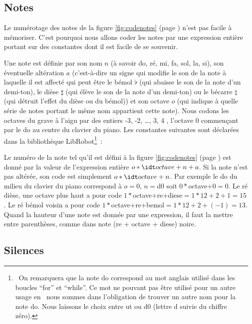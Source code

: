 

\subsection{Notes}

\noindent Le numérotage des notes de la figure \ref{fig:codenotes} (page \pageref{fig:codenotes}) n'est
pas facile à mé\-mo\-ri\-ser. C'est pourquoi nous allons coder les notes par
une expression entière portant sur des constantes dont il est facile de se souvenir.

Une note est définie par son nom $n$ (à savoir do, ré, mi, fa, sol, la, si), son éventuelle
altération $a$ (c'est-à-dire un signe qui modifie le son de la note à laquelle il est affecté
qui peut être le bémol $\flat$ (qui abaisse le son de la note d'un demi-ton),
le dièse $\sharp$ (qui élève le son de la note d'un demi-ton) ou
le bécarre $\natural$ (qui détruit l'effet du dièse ou du bémol)) et
son octave $o$ (qui indique à quelle série de notes portant le même nom appartient cette note).
Nous codons les octaves du grave à l'aigu par des entiers -3, -2, \ldots, 3, 4 ,
l'octave 0 commençant par le do au centre du clavier du piano. Les
constantes suivantes sont déclarées dans la bibliothèque {\idt LibRobot}\footnote{\ On remarquera que la note {\mcl do} correspond au mot
anglais utilisé dans les boucles ``for'' et ``while''.
Ce mot ne pouvant pas être utilisé pour un autre usage en \ocaml\ nous sommes dans l'obligation
de trouver un autre nom pour la note do. Nous laissons le choix entre {\idt ut} ou {\idt d0} (lettre d
suivie du chiffre zéro).}~:



\noindent Le numéro de la note tel qu'il est  défini à la figure \ref{fig:codenotes}
(page \pageref{fig:codenotes}) est donné par la valeur de l'expression entière
$o \ast {\idt octave} + n + a$. Si la note n'est pas altérée, son code est simplement
$o \ast {\idt octave} + n$. Par exemple le do du milieu du clavier du piano correspond à
$o = 0$, $n = ${\idt d0} soit $0 \ast ${\idt octave}$ + 0 = 0$. Le ré dièse, une octave plus haut
a pour code $1 \ast ${\idt octave}$ + ${\idt re}$ + ${\idt diese}$
= 1 \ast 12 + 2 + 1 = 15$. Le ré bémol voisin
a pour code $1 \ast ${\idt octave}$ + ${\idt re}$ + ${\idt bemol}$
= 1 \ast 12 + 2 + (-1) = 13$. Quand la hauteur d'une note est donnée par une expression,
il faut la mettre entre parenthèses, comme dans {\idt note (re + octave + diese) noire}.

\subsection{Silences}

